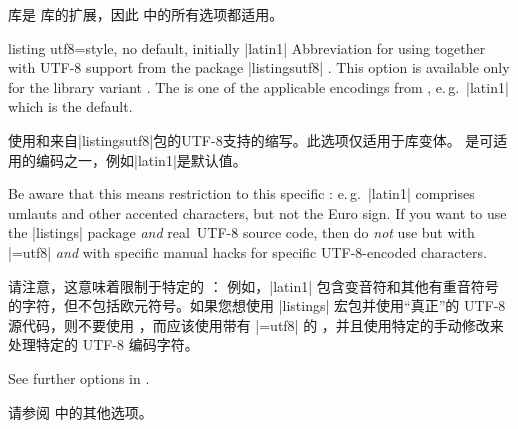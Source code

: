  库是  库的扩展，因此  中的所有选项都适用。
\begin{docTcbKey}{listing utf8}{=}{style, no default, initially |latin1|}
Abbreviation for using 
together with UTF-8 support from the package |listingsutf8| .
This option is available only for the library variant .
The  is one of
the applicable encodings from , e.\,g.\ |latin1|
which is the default.\par


使用和来自|listingsutf8|包的UTF-8支持的缩写。此选项仅适用于库变体。  是可适用的编码之一，例如|latin1|是默认值。

Be aware that this means restriction to this specific :
e.\,g.\ |latin1| comprises umlauts and other accented characters, but not
the Euro sign. If you want to use the |listings| package \emph{and} \flqq real\frqq\
UTF-8 source code, then do \emph{not} use  but 
with
|=utf8|
\emph{and} with specific manual hacks for specific UTF-8-encoded characters.


请注意，这意味着限制于特定的 ： 例如，|latin1| 包含变音符和其他有重音符号的字符，但不包括欧元符号。如果您想使用 |listings| 宏包并使用“真正”的 UTF-8 源代码，则不要使用 ，而应该使用带有 |=utf8| 的 ，并且使用特定的手动修改来处理特定的 UTF-8 编码字符。
\end{docTcbKey}

See further options in .

请参阅  中的其他选项。